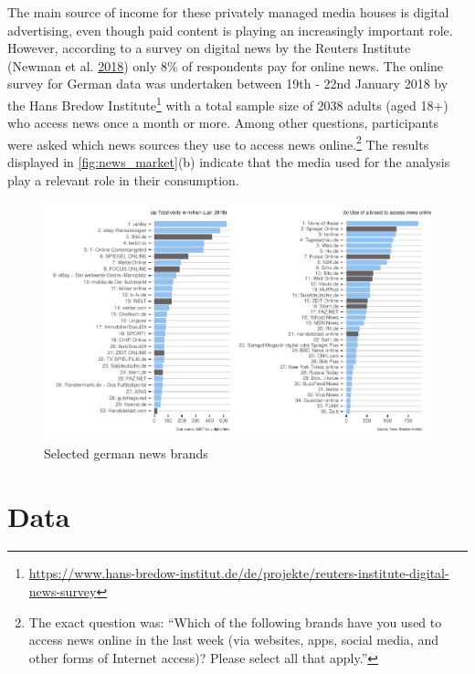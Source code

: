 \documentclass[
]{article}
\begin{document}
The main source of income for these privately managed media houses is
digital advertising, even though paid content is playing an increasingly
important role. However, according to a survey on digital news by the
Reuters Institute (Newman et al.
\protect\hyperlink{ref-newman_reuters_2018}{2018}) only 8\% of
respondents pay for online news. The online survey for German data was
undertaken between 19th - 22nd January 2018 by the Hans Bredow
Institute\footnote{\url{https://www.hans-bredow-institut.de/de/projekte/reuters-institute-digital-news-survey}}
with a total sample size of 2038 adults (aged 18+) who access news once
a month or more. Among other questions, participants were asked which
news sources they use to access news online.\footnote{The exact question
  was: ``Which of the following brands have you used to access news
  online in the last week (via websites, apps, social media, and other
  forms of Internet access)? Please select all that apply.''} The
results displayed in \autoref{fig:news_market}(b) indicate that the
media used for the analysis play a relevant role in their consumption.

\begin{figure}

{\centering \includegraphics[width=1\linewidth]{main_text_files/figure-latex/unnamed-chunk-1-1} 

}

\caption{Selected german news brands \label{fig:news_market}}\label{fig:unnamed-chunk-1}
\end{figure}

\hypertarget{data}{%
\section{Data}\label{data}}
\end{document}
